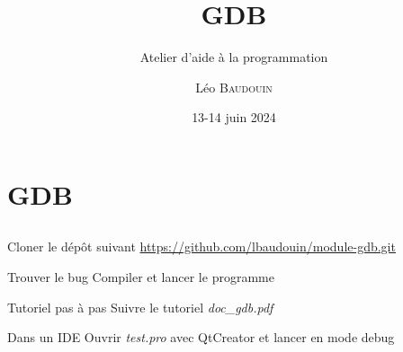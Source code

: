 \documentclass{beamer}
\title{GDB}
\subtitle{Atelier d'aide à la programmation}
\author{L\'eo \textsc{Baudouin}}
\institute{
  {\url{baudouin.leo @ gmail.com}}
}
\date{13-14 juin 2024}
\begin{document}
\begin{frame}
  \titlepage
\end{frame}

\section{GDB}
\subsection{}

\begin{frame}{}

\begin{block}{Cloner le dép\^ot suivant}
\url{https://github.com/lbaudouin/module-gdb.git}
\end{block}

\begin{block}{Trouver le bug}
Compiler et lancer le programme
\end{block}

\begin{block}{Tutoriel pas à pas}
Suivre le tutoriel \emph{doc\_gdb.pdf}\footnotemark
\end{block}

\begin{block}{Dans un IDE}
Ouvrir \emph{test.pro} avec QtCreator et lancer en mode debug
\end{block}


\end{frame}


\end{document}
